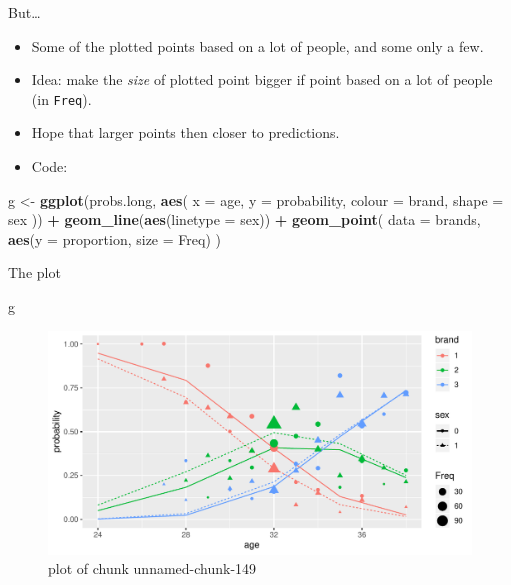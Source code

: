 \documentclass[ignorenonframetext,]{beamer}
\newenvironment{Shaded}{\begin{snugshade}}{\end{snugshade}}
\newcommand{\DataTypeTok}[1]{\textcolor[rgb]{0.13,0.29,0.53}{#1}}
\newcommand{\KeywordTok}[1]{\textcolor[rgb]{0.13,0.29,0.53}{\textbf{#1}}}
\newcommand{\NormalTok}[1]{#1}
\newcommand{\OperatorTok}[1]{\textcolor[rgb]{0.81,0.36,0.00}{\textbf{#1}}}
\newcommand{\StringTok}[1]{\textcolor[rgb]{0.31,0.60,0.02}{#1}}
\begin{document}
\begin{frame}[fragile]{But\ldots}
\protect\hypertarget{but-1}{}

\begin{itemize}
\item
  Some of the plotted points based on a lot of people, and some only a
  few.
\item
  Idea: make the \emph{size} of plotted point bigger if point based on a
  lot of people (in \texttt{Freq}).
\item
  Hope that larger points then closer to predictions.
\item
  Code:
\end{itemize}

\footnotesize

\begin{Shaded}
\begin{Highlighting}[]
\NormalTok{g <-}\StringTok{ }\KeywordTok{ggplot}\NormalTok{(probs.long, }\KeywordTok{aes}\NormalTok{(}
  \DataTypeTok{x =}\NormalTok{ age, }\DataTypeTok{y =}\NormalTok{ probability,}
  \DataTypeTok{colour =}\NormalTok{ brand, }\DataTypeTok{shape =}\NormalTok{ sex}
\NormalTok{)) }\OperatorTok{+}
\StringTok{  }\KeywordTok{geom_line}\NormalTok{(}\KeywordTok{aes}\NormalTok{(}\DataTypeTok{linetype =}\NormalTok{ sex)) }\OperatorTok{+}
\StringTok{  }\KeywordTok{geom_point}\NormalTok{(}
    \DataTypeTok{data =}\NormalTok{ brands,}
    \KeywordTok{aes}\NormalTok{(}\DataTypeTok{y =}\NormalTok{ proportion, }\DataTypeTok{size =}\NormalTok{ Freq)}
\NormalTok{  )}
\end{Highlighting}
\end{Shaded}

\normalsize

\end{frame}

\begin{frame}[fragile]{The plot}
\protect\hypertarget{the-plot-3}{}

\begin{Shaded}
\begin{Highlighting}[]
\NormalTok{g}
\end{Highlighting}
\end{Shaded}

\begin{figure}
\centering
\includegraphics{figure/unnamed-chunk-149-1.pdf}
\caption{plot of chunk unnamed-chunk-149}
\end{figure}

\end{frame}
\end{document}
